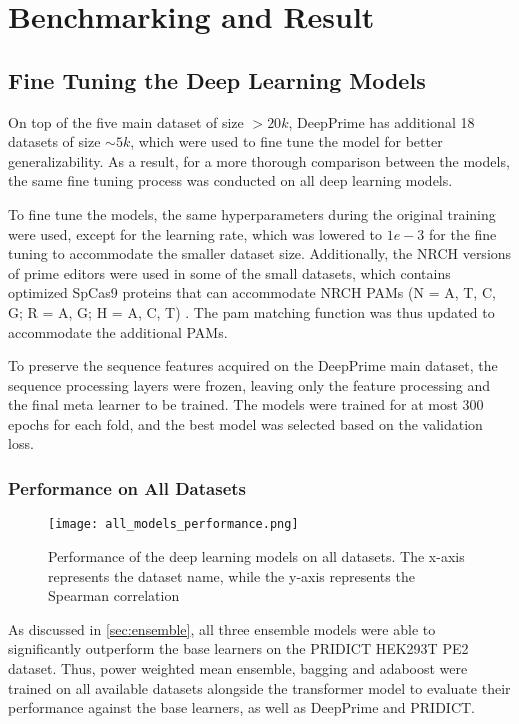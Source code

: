 \chapter{Benchmarking and Result}

\section{Fine Tuning the Deep Learning Models}

On top of the five main dataset of size $> 20k$, DeepPrime has additional 18 datasets of size $\sim5k$, which were used to fine tune the model for better generalizability. As a result, for a more thorough comparison between the models, the same fine tuning process was conducted on all deep learning models.

To fine tune the models, the same hyperparameters during the original training were used, except for the learning rate, which was lowered to $1e-3$ for the fine tuning to accommodate the smaller dataset size. Additionally, the NRCH versions of prime editors were used in some of the small datasets, which contains optimized SpCas9 proteins that can accommodate NRCH PAMs (N = A, T, C, G; R = A, G; H = A, C, T) \cite{millerContinuousEvolutionSpCas92020}. The pam matching function was thus updated to accommodate the additional PAMs.

To preserve the sequence features acquired on the DeepPrime main dataset, the sequence processing layers were frozen, leaving only the feature processing and the final meta learner to be trained. The models were trained for at most 300 epochs for each fold, and the best model was selected based on the validation loss.


\subsection{Performance on All Datasets}

\begin{figure}
    \centering
    \texttt{[image: all\_models\_performance.png]}
    \caption[Performance of the models on all datasets]{Performance of the deep learning models on all datasets. The x-axis represents the dataset name, while the y-axis represents the Spearman correlation}
\end{figure}

As discussed in \autoref{sec:ensemble}, all three ensemble models were able to significantly outperform the base learners on the PRIDICT HEK293T PE2 dataset. Thus, power weighted mean ensemble, bagging and adaboost were trained on all available datasets alongside the transformer model to evaluate their performance against the base learners, as well as DeepPrime and PRIDICT.

